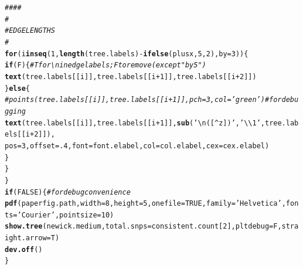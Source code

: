 \documentclass{article}\usepackage[]{graphicx}\usepackage[]{color}
\makeatletter
\newcommand{\hlnum}[1]{\textcolor[rgb]{0.686,0.059,0.569}{#1}}%
\newcommand{\hlstr}[1]{\textcolor[rgb]{0.192,0.494,0.8}{#1}}%
\newcommand{\hlcom}[1]{\textcolor[rgb]{0.678,0.584,0.686}{\textit{#1}}}%
\newcommand{\hlopt}[1]{\textcolor[rgb]{0,0,0}{#1}}%
\newcommand{\hlstd}[1]{\textcolor[rgb]{0.345,0.345,0.345}{#1}}%
\newcommand{\hlkwa}[1]{\textcolor[rgb]{0.161,0.373,0.58}{\textbf{#1}}}%
\newcommand{\hlkwc}[1]{\textcolor[rgb]{0.333,0.667,0.333}{#1}}%
\newcommand{\hlkwd}[1]{\textcolor[rgb]{0.737,0.353,0.396}{\textbf{#1}}}%
\newenvironment{kframe}{%
 \def\at@end@of@kframe{}%
 \ifinner\ifhmode%
  \def\at@end@of@kframe{\end{minipage}}%
  \begin{minipage}{\columnwidth}%
 \fi\fi%
 \def\FrameCommand##1{\hskip\@totalleftmargin \hskip-\fboxsep
 \colorbox{shadecolor}{##1}\hskip-\fboxsep
     \hskip-\linewidth \hskip-\@totalleftmargin \hskip\columnwidth}%
 \MakeFramed {\advance\hsize-\width
   \@totalleftmargin\z@ \linewidth\hsize
   \@setminipage}}%
 {\par\unskip\endMakeFramed%
 \at@end@of@kframe}
\newenvironment{knitrout}{}{} %
\makeatother
\begin{document}
\begin{knitrout}
\begin{kframe}
\begin{alltt}
  \hlcom{####}
  \hlcom{#}
  \hlcom{# EDGE LENGTHS}
  \hlcom{#}
  \hlkwa{for}\hlstd{(i} \hlkwa{in} \hlkwd{seq}\hlstd{(}\hlnum{1}\hlstd{,}\hlkwd{length}\hlstd{(tree.labels)}\hlopt{-}\hlkwd{ifelse}\hlstd{(plusx,}\hlnum{5}\hlstd{,}\hlnum{2}\hlstd{),}\hlkwc{by}\hlstd{=}\hlnum{3}\hlstd{))\{}
    \hlkwa{if}\hlstd{(F)\{} \hlcom{# T for \textbackslash{}n in edge labels; F to remove (except "by 5")}
      \hlkwd{text}\hlstd{(tree.labels[[i]], tree.labels[[i}\hlopt{+}\hlnum{1}\hlstd{]], tree.labels[[i}\hlopt{+}\hlnum{2}\hlstd{]])}
    \hlstd{\}} \hlkwa{else} \hlstd{\{}
      \hlcom{# points(tree.labels[[i]], tree.labels[[i+1]], pch=3,col='green') # for debugging}
      \hlkwd{text}\hlstd{(tree.labels[[i]], tree.labels[[i}\hlopt{+}\hlnum{1}\hlstd{]],} \hlkwd{sub}\hlstd{(}\hlstr{'\textbackslash{}n([^z])'}\hlstd{,}\hlstr{' \textbackslash{}\textbackslash{}1'}\hlstd{, tree.labels[[i}\hlopt{+}\hlnum{2}\hlstd{]]),}
           \hlkwc{pos}\hlstd{=}\hlnum{3}\hlstd{,} \hlkwc{offset}\hlstd{=}\hlnum{.4}\hlstd{,} \hlkwc{font}\hlstd{=font.elabel,} \hlkwc{col}\hlstd{=col.elabel,}\hlkwc{cex}\hlstd{=cex.elabel)}
    \hlstd{\}}
  \hlstd{\}}
\hlstd{\}}
\hlkwa{if}\hlstd{(}\hlnum{FALSE}\hlstd{)\{}\hlcom{#for debug convenience}
  \hlkwd{pdf}\hlstd{(paperfig.path,} \hlkwc{width}\hlstd{=}\hlnum{8}\hlstd{,}\hlkwc{height}\hlstd{=}\hlnum{5}\hlstd{,}\hlkwc{onefile}\hlstd{=}\hlnum{TRUE}\hlstd{,}\hlkwc{family}\hlstd{=}\hlstr{'Helvetica'}\hlstd{,}\hlkwc{fonts}\hlstd{=}\hlstr{'Courier'}\hlstd{,}\hlkwc{pointsize}\hlstd{=}\hlnum{10}\hlstd{)}
  \hlkwd{show.tree}\hlstd{(newick.medium,} \hlkwc{total.snps}\hlstd{=consistent.count[}\hlnum{2}\hlstd{],} \hlkwc{pltdebug}\hlstd{=F,}\hlkwc{straight.arrow}\hlstd{=T)}
  \hlkwd{dev.off}\hlstd{()}
\hlstd{\}}
\end{alltt}
\end{kframe}
\end{knitrout}
\end{document}
